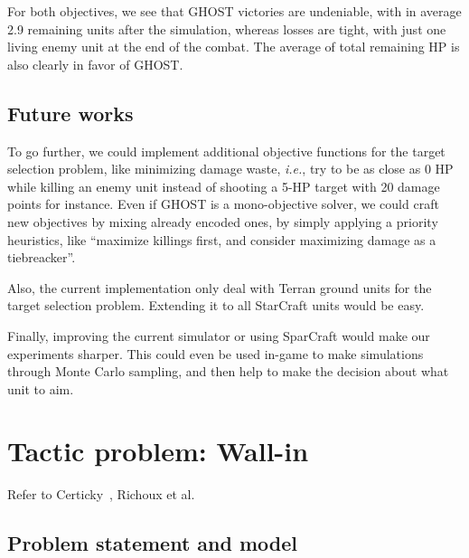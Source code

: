 \documentclass[journal]{IEEEtran}
\newcommand{\ghost}{\textsc{GHOST}\xspace}
\newcommand{\ie}{\textit{i.e.}}
\begin{document}
For both objectives, we see that \ghost victories are undeniable, with
in average  2.9 remaining units  after the simulation,  whereas losses
are  tight,  with  just one  living  enemy  unit  at  the end  of  the
combat. The average of total remaining  HP is also clearly in favor of
\ghost.

\subsection{Future works}

To go further,  we could implement additional  objective functions for
the target selection  problem, like minimizing damage  waste, \ie, try
to be as close as 0 HP while killing an enemy unit instead of shooting
a 5-HP target with 20 damage points  for instance. Even if \ghost is a
mono-objective solver, we could craft new objectives by mixing already
encoded  ones,   by  simply  applying  a   priority  heuristics,  like
``maximize  killings  first,  and  consider  maximizing  damage  as  a
tiebreacker''.

Also, the  current implementation only  deal with Terran  ground units
for the target selection problem.  Extending it to all StarCraft units
would be easy.

Finally, improving the current simulator or using SparCraft would make
our  experiments sharper.   This could  even be  used in-game  to make
simulations through  Monte Carlo sampling,  and then help to  make the
decision about what unit to aim.

\section{Tactic problem: Wall-in}\label{sec:wall}
Refer to Certicky~\cite{Certicky13}, Richoux et al.~\cite{RichouxUO14}
\subsection{Problem statement and model}
\end{document}
